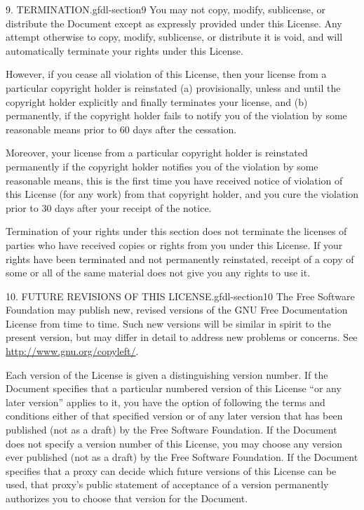 \documentclass[10pt,]{book}
\numberwithin{equation}{section}
\begin{document}
\begin{paragraphs}{9. TERMINATION.}{gfdl-section9}%
\hypertarget{p-1575}{}%
You may not copy, modify, sublicense, or distribute the Document except as expressly provided under this License. Any attempt otherwise to copy, modify, sublicense, or distribute it is void, and will automatically terminate your rights under this License.%
\par
\hypertarget{p-1576}{}%
However, if you cease all violation of this License, then your license from a particular copyright holder is reinstated (a) provisionally, unless and until the copyright holder explicitly and finally terminates your license, and (b) permanently, if the copyright holder fails to notify you of the violation by some reasonable means prior to 60 days after the cessation.%
\par
\hypertarget{p-1577}{}%
Moreover, your license from a particular copyright holder is reinstated permanently if the copyright holder notifies you of the violation by some reasonable means, this is the first time you have received notice of violation of this License (for any work) from that copyright holder, and you cure the violation prior to 30 days after your receipt of the notice.%
\par
\hypertarget{p-1578}{}%
Termination of your rights under this section does not terminate the licenses of parties who have received copies or rights from you under this License. If your rights have been terminated and not permanently reinstated, receipt of a copy of some or all of the same material does not give you any rights to use it.%
\end{paragraphs}%
\begin{paragraphs}{10. FUTURE REVISIONS OF THIS LICENSE.}{gfdl-section10}%
\hypertarget{p-1579}{}%
The Free Software Foundation may publish new, revised versions of the GNU Free Documentation License from time to time. Such new versions will be similar in spirit to the present version, but may differ in detail to address new problems or concerns. See \url{http://www.gnu.org/copyleft/}.%
\par
\hypertarget{p-1580}{}%
Each version of the License is given a distinguishing version number. If the Document specifies that a particular numbered version of this License ``or any later version'' applies to it, you have the option of following the terms and conditions either of that specified version or of any later version that has been published (not as a draft) by the Free Software Foundation. If the Document does not specify a version number of this License, you may choose any version ever published (not as a draft) by the Free Software Foundation. If the Document specifies that a proxy can decide which future versions of this License can be used, that proxy's public statement of acceptance of a version permanently authorizes you to choose that version for the Document.%
\end{paragraphs}%
\end{document}
